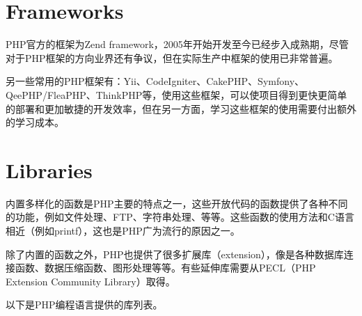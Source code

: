 \section{Frameworks}

PHP官方的框架为Zend framework，2005年开始开发至今已经步入成熟期，尽管对于PHP框架的方向业界还有争议，但在实际生产中框架的使用已非常普遍。

另一些常用的PHP框架有：Yii、CodeIgniter、CakePHP、Symfony、QeePHP/FleaPHP、ThinkPHP等，使用这些框架，可以使项目得到更快更简单的部署和更加敏捷的开发效率，但在另一方面，学习这些框架的使用需要付出额外的学习成本。





\section{Libraries}



内置多样化的函数是PHP主要的特点之一，这些开放代码的函数提供了各种不同的功能，例如文件处理、FTP、字符串处理、等等。这些函数的使用方法和C语言相近（例如printf），这也是PHP广为流行的原因之一。

除了内置的函数之外，PHP也提供了很多扩展库（extension），像是各种数据库连接函数、数据压缩函数、图形处理等等。有些延伸库需要从PECL（PHP Extension Community Library）取得。

以下是PHP编程语言提供的库列表。



